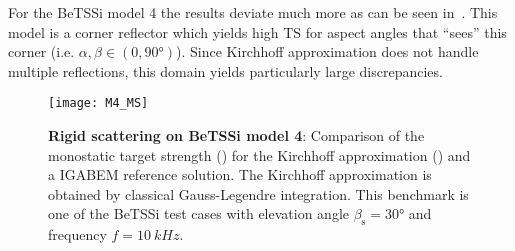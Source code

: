 For the BeTSSi model 4 the results deviate much more as can be seen in~. This model is a corner reflector which yields high TS for aspect angles that ``sees'' this corner (i.e. $\alpha,\beta\in(0,\ang{90})$). Since Kirchhoff approximation does not handle multiple reflections, this domain yields particularly large discrepancies. 
\begin{figure}
	\centering
	\texttt{[image: M4\_MS]}
	\caption{\textbf{Rigid scattering on BeTSSi model 4}: Comparison of the monostatic target strength () for the Kirchhoff approximation () and a IGABEM reference solution. The Kirchhoff approximation is obtained by classical Gauss-Legendre integration. This benchmark is one of the BeTSSi test cases with elevation angle $\beta_{\mathrm{s}}=\ang{30}$ and frequency $f=\SI{10}{kHz}$.}
	\label{Fig4:BeTSSi_M4results}
\end{figure}

